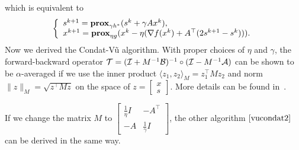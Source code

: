 which is equivalent to
$$\left\{
\begin{array}{l}
s^{k+1}=\prox_{\gamma h^*} (s^k+\gamma Ax^k),\\
x^{k+1}=\prox_{\eta g}(x^k-\eta(\nabla f(x^k)+A^\top(2s^{k+1}-s^k))).
\end{array}
\right.$$
Now we derived the Condat-V\~{u} algorithm. With proper choices of $\eta$ and $\gamma $, the forward-backward operator ${\mathcal{T}}=({\mathcal{I}}+M^{-1}{\mathcal{B}})^{-1}\circ({\mathcal{I}}-M^{-1}{\mathcal{A}})$ can be shown to be $\alpha$-averaged if we use the inner product $\langle z_1,z_2\rangle_M=z_1^\top Mz_2$ and norm $\|z\|_M=\sqrt{z^\top Mz}$ on the space of $z=\begin{bmatrix}x\\ s\end{bmatrix}$. More details can be found in~\cite{davis2014convergence}.

If we change the matrix $M$ to $\begin{bmatrix}
\frac{1}{\eta}I&-A^\top\\
-A&\frac{1}{\gamma}I
\end{bmatrix}$, the other algorithm $\eqref{vucondat2}$ can be derived in the same way.
